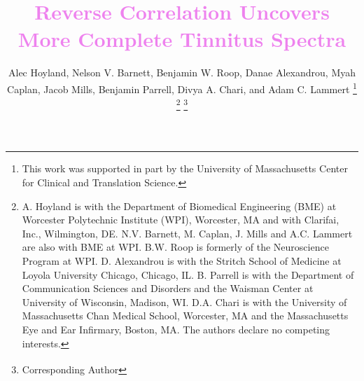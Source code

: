\documentclass[journal]{IEEEtran}
\begin{document}
%
\title{\textcolor{violet}{Reverse Correlation Uncovers More Complete Tinnitus Spectra \vspace{0.25cm}}}

%
%
%

\author{Alec Hoyland, Nelson V. Barnett, Benjamin W. Roop, Danae Alexandrou, Myah Caplan, Jacob Mills, Benjamin Parrell, Divya A. Chari, and Adam C. Lammert\textsuperscript{\textdagger{}}%
\thanks{This work was supported in part by the University of Massachusetts
Center for Clinical and Translation Science.}%
\thanks{A. Hoyland is with the Department of Biomedical Engineering (BME)
at Worcester Polytechnic Institute (WPI), Worcester, MA and with Clarifai, Inc., Wilmington, DE.
N.V. Barnett, M. Caplan, J. Mills and A.C. Lammert are also with BME at WPI.
B.W. Roop is formerly of the Neuroscience Program at WPI.
D. Alexandrou is with the Stritch School of Medicine at Loyola University Chicago, Chicago, IL.
B. Parrell is with the Department of Communication Sciences and Disorders and the Waisman Center at University of Wisconsin, Madison, WI. D.A. Chari is with the
University of Massachusetts Chan Medical School, Worcester, MA
and the Massachusetts Eye and Ear Infirmary,
Boston, MA.
The authors declare no competing interests.}%
\thanks{\textsuperscript{\textdagger{}} Corresponding Author}}%

% 
%
\end{document}
